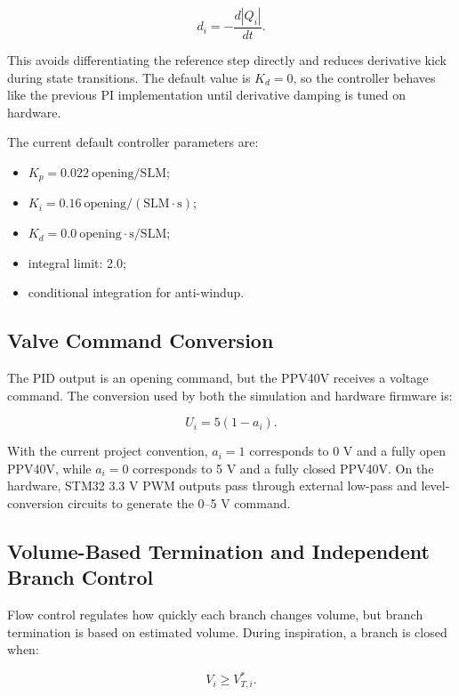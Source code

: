 \documentclass[11pt,a4paper]{article}
\begin{document}
\begin{equation}
  d_i=-\frac{d|Q_i|}{dt}.
\end{equation}

This avoids differentiating the reference step directly and reduces derivative kick during state transitions. The default value is $K_d=0$, so the controller behaves like the previous PI implementation until derivative damping is tuned on hardware.

The current default controller parameters are:

\begin{itemize}
  \item $K_p=0.022~\mathrm{opening/SLM}$;
  \item $K_i=0.16~\mathrm{opening/(SLM\cdot s)}$;
  \item $K_d=0.0~\mathrm{opening\cdot s/SLM}$;
  \item integral limit: 2.0;
  \item conditional integration for anti-windup.
\end{itemize}

\subsection{Valve Command Conversion}

The PID output is an opening command, but the PPV40V receives a voltage command. The conversion used by both the simulation and hardware firmware is:

\begin{equation}
  U_i=5(1-a_i).
\end{equation}

With the current project convention, $a_i=1$ corresponds to 0 V and a fully open PPV40V, while $a_i=0$ corresponds to 5 V and a fully closed PPV40V. On the hardware, STM32 3.3 V PWM outputs pass through external low-pass and level-conversion circuits to generate the 0--5 V command.

\subsection{Volume-Based Termination and Independent Branch Control}

Flow control regulates how quickly each branch changes volume, but branch termination is based on estimated volume. During inspiration, a branch is closed when:

\begin{equation}
  V_i \geq V^*_{T,i}.
\end{equation}
\end{document}
